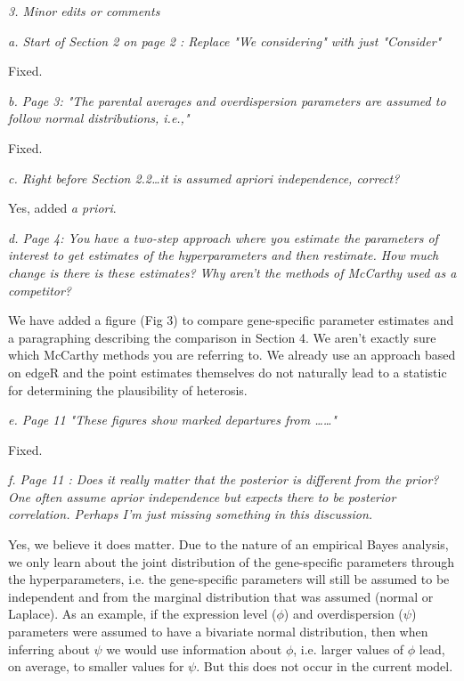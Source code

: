 \documentclass{article}
\newcommand{\comment}[1]{\textit{#1}}
\newcommand{\response}[1]{#1}
\begin{document}
\comment{3.      Minor edits or comments}

\comment{a.      Start of Section 2 on page 2  :  Replace "We considering" with just "Consider"}

\response{Fixed.}

\comment{b.      Page 3: "The parental averages and overdispersion parameters are assumed to follow normal distributions, i.e.,"}

\response{Fixed.}

\comment{c.      Right before Section 2.2…it is assumed apriori independence, correct?}

\response{Yes, added \emph{a priori}.}

\comment{d.      Page 4: You have a two-step approach where you estimate the parameters of interest to get estimates of the hyperparameters and then restimate.  How much change is there is these estimates?  Why aren't the methods of McCarthy used as a competitor?}

\response{We have added a figure (Fig 3) to compare gene-specific parameter estimates and a paragraphing describing the comparison in Section 4. We aren't exactly sure which McCarthy methods you are referring to. We already use an approach based on edgeR and the point estimates themselves do not naturally lead to a statistic for determining the plausibility of heterosis.}

\comment{e.      Page 11 "These figures show marked departures from ……"}

\response{Fixed.}

\comment{f.      Page 11 : Does it really matter that the posterior is different from the prior?  One often assume aprior independence but expects there to be posterior correlation.  Perhaps I'm just missing something in this discussion.}

\response{Yes, we believe it does matter. Due to the nature of an empirical Bayes analysis, we only learn about the joint distribution of the gene-specific parameters through the hyperparameters, i.e. the gene-specific parameters will still be assumed to be independent and from the marginal distribution that was assumed (normal or Laplace). As an example, if the expression level ($\phi$) and overdispersion ($\psi$) parameters were assumed to have a bivariate normal distribution, then when inferring about $\psi$ we would use information about $\phi$, i.e. larger values of $\phi$ lead, on average, to smaller values for $\psi$. But this does not occur in the current model.}
\end{document}
